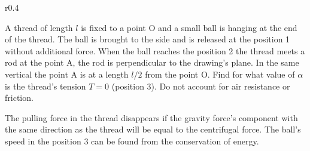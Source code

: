 {\ifEngStatement
\begin{wrapfigure}[10]{r}{0.4\textwidth}
\vspace{-5pt}
\end{wrapfigure}
A thread of length $l$ is fixed to a point O and a small ball is hanging at the end of the thread. The ball is brought to the side and is released at the position 1 without additional force. When the ball reaches the position 2 the thread meets a rod at the point A, the rod is perpendicular to the drawing’s plane. In the same vertical the point A is at a length $l/2$ from the point O. Find for what value of $\alpha$ is the thread’s tension $T=0$ (position 3). Do not account for air resistance or friction.
\fi


\ifEngHint
The pulling force in the thread disappears if the gravity force’s component with the same direction as the thread will be equal to the centrifugal force. The ball’s speed in the position 3 can be found from the conservation of energy.
\fi


}
